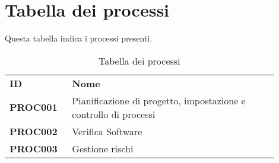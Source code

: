 \documentclass[PianoDiQualifica.tex]{subfiles}
\begin{document}
\section{Tabella dei processi}
Questa tabella indica i processi presenti.
\begin{table}[H]
	\begin{center}
		\begin{tabu} to 
			\tableHeaderStyle
			\textbf{ID} & \textbf{Nome} \\
			\textbf{PROC001} & {Pianificazione di progetto, impostazione e controllo di processi}\\ 
			\textbf{PROC002} & {Verifica Software}\\ 
			\textbf{PROC003} & {Gestione rischi}\\ 
			
		\end{tabu}
		\caption{Tabella dei processi}
		\vspace{-1em}
	\end{center}
\end{table}
\end{document}
